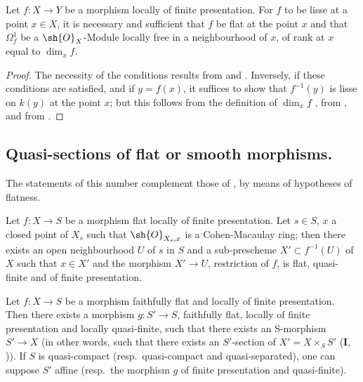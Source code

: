 \begin{proposition}[17.15.15]
\label{IV.17.15.15}
Let $f:X\to Y$ be a morphism locally of finite presentation.
For $f$ to be lisse at a point $x\in X$, it is necessary and sufficient that $f$ be flat at the point $x$ and that $\Omega^1_f$ be a $\sh{O}_X$-Module locally free in a neighbourhood of $x$, of rank at $x$ equal to $\dim_x f$.
\end{proposition}

\begin{proof}
The necessity of the conditions results from  and .
Inversely, if these conditions are satisfied, and if $y=f(x)$, it suffices to show  that $f^{-1}(y)$ is lisse on $k(y)$ at the point $x$; but this follows from the definition of $\dim_x f$ , from , and from .
\end{proof}


\subsection{Quasi-sections of flat or smooth morphisms.}
\label{subsection:IV.17.16}


The statements of this number complement those of , by means of hypotheses of flatness.

\begin{proposition}[17.16.1]
\label{IV.17.16.1}
Let $f:X\to S$ be a morphism flat locally of finite presentation.
Let $s\in S$, $x$ a closed point of $X_s$ such that $\sh{O}_{X_s,x}$ is a Cohen-Macaulay ring; then there exists an open neighbourhood $U$ of $s$ in $S$ and a sub-prescheme $X'\subset f^{-1}(U)$ of $X$ such that $x\in X'$ and the morphism $X'\to U$, restriction of $f$, is flat, quasi-finite and of finite presentation.
\end{proposition}

\begin{corollary}[17.16.2]
\label{IV.17.16.2}
Let $f:X\to S$ be a morphism faithfully flat and locally of finite presentation.
Then there exists a morphism $g:S'\to S$, faithfully flat, locally of finite presentation and locally quasi-finite, such that there exists an S-morphism $S'\to X$ (in other words, such that there exists an $S'$-section of $X'=X\times_S S'$ ($\mathbf{I}$, )).
If $S$ is quasi-compact (resp.\ quasi-compact and quasi-separated), one can suppose $S'$ affine (resp.\ the morphism $g$ of finite presentation and quasi-finite).
\end{corollary}

